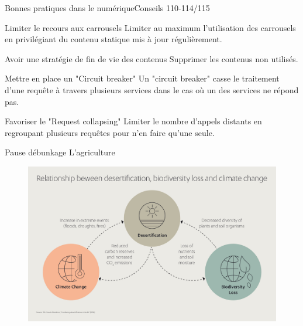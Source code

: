 \begin{frame}{Bonnes pratiques dans le numérique}{Conseils 110-114/115}
\begin{block}{Limiter le recours aux carrousels}
Limiter au maximum l'utilisation des carrousels en privilégiant du contenu statique mis à jour régulièrement. 
\end{block}

\begin{block}{Avoir une stratégie de fin de vie des contenus}
Supprimer les contenus non utilisés. 
\end{block}


\begin{block}{Mettre en place un "Circuit breaker"}
Un "circuit breaker" casse le traitement d'une requête à travers plusieurs services dans le cas où un des services ne répond pas.

\end{block}


\begin{block}{Favoriser le "Request collapsing"}
Limiter le nombre d’appels distants en regroupant plusieurs requêtes pour n’en faire qu’une seule.
\end{block}

\end{frame}


\begin{frame}{Pause débunkage }{L'agriculture}

\begin{figure}
    \centering
    \includegraphics[scale=0.5]{chapitre2/wdd9/fig/agri.jpg}
\end{figure}
\end{frame}


